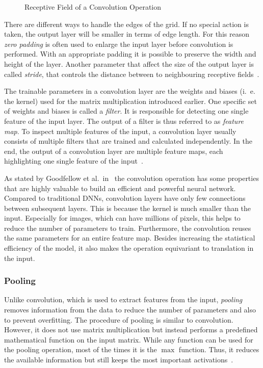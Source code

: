 \begin{figure}[h]
    \centering
    
    \caption[Receptive Field of a Convolution Operation]{Receptive Field of a Convolution Operation~\cite[modified]{github-latex20}}
    \label{fig:convolution}
\end{figure}

There are different ways to handle the edges of the grid. If no special action is taken, the output layer will be smaller in terms of edge length. For this reason \emph{zero padding} is often used to enlarge the input layer before convolution is performed. With an appropriate padding it is possible to preserve the width and height of the layer. Another parameter that affect the size of the output layer is called \emph{stride}, that controls the distance between to neighbouring receptive fields~\cite[p.~361]{praxiseinstieg_ml17}.

The trainable parameters in a convolution layer are the weights and biases (i.~e. the kernel) used for the matrix multiplication introduced earlier. One specific set of weights and biases is called a \emph{filter}. It is responsible for detecting one single feature of the input layer. The output of a filter is thus referred to as \emph{feature map}. To inspect multiple features of the input, a convolution layer usually consists of multiple filters that are trained and calculated independently. In the end, the output of a convolution layer are multiple feature maps, each highlighting one single feature of the input~\cite[p.~363 f]{praxiseinstieg_ml17}.

As stated by Goodfellow et al.\ in~\cite{DLbook16} the convolution operation has some properties that are highly valuable to build an efficient and powerful neural network. Compared to traditional DNNs, convolution layers have only few connections between subsequent layers. This is because the kernel is much smaller than the input. Especially for images, which can have millions of pixels, this helps to reduce the number of parameters to train. Furthermore, the convolution reuses the same parameters for an entire feature map. Besides increasing the statistical efficiency of the model, it also makes the operation equivariant to translation in the input.

\subsubsection{Pooling}
\label{sec:pooling}
Unlike convolution, which is used to extract features from the input, \emph{pooling} removes information from the data to reduce the number of parameters and also to prevent overfitting. The procedure of pooling is similar to convolution. However, it does not use matrix multiplication but instead performs a predefined mathematical function on the input matrix. While any function can be used for the pooling operation, most of the times it is the $\max$ function. Thus, it reduces the available information but still keeps the most important activations~\cite[p.~369 f]{praxiseinstieg_ml17}.

